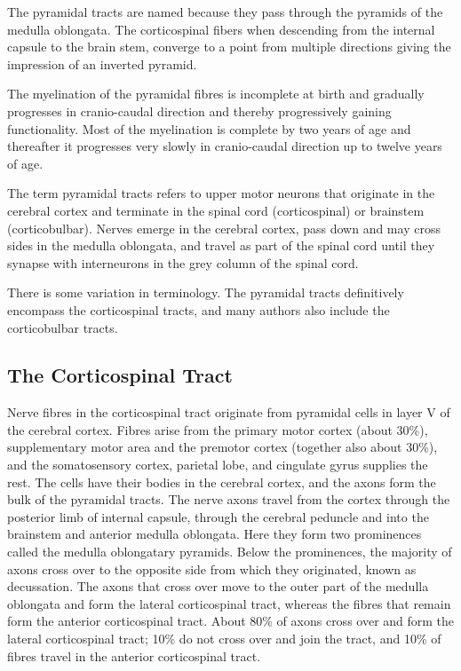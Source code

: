 The pyramidal tracts are named because they pass through the pyramids of the medulla oblongata. The corticospinal fibers when descending from the internal capsule to the brain stem, converge to a point from multiple directions giving the impression of an inverted pyramid.

The myelination of the pyramidal fibres is incomplete at birth and gradually progresses in cranio-caudal direction and thereby progressively gaining functionality. Most of the myelination is complete by two years of age and thereafter it progresses very slowly in cranio-caudal direction up to twelve years of age.

The term pyramidal tracts refers to upper motor neurons that originate in the cerebral cortex and terminate in the spinal cord (corticospinal) or brainstem (corticobulbar). Nerves emerge in the cerebral cortex, pass down and may cross sides in the medulla oblongata, and travel as part of the spinal cord until they synapse with interneurons in the grey column of the spinal cord.

There is some variation in terminology. The pyramidal tracts definitively encompass the corticospinal tracts, and many authors also include the corticobulbar tracts.

\hypertarget{the-corticospinal-tract}{%
\subsection{The Corticospinal Tract}\label{the-corticospinal-tract}}

Nerve fibres in the corticospinal tract originate from pyramidal cells in layer V of the cerebral cortex. Fibres arise from the primary motor cortex (about 30\%), supplementary motor area and the premotor cortex (together also about 30\%), and the somatosensory cortex, parietal lobe, and cingulate gyrus supplies the rest. The cells have their bodies in the cerebral cortex, and the axons form the bulk of the pyramidal tracts. The nerve axons travel from the cortex through the posterior limb of internal capsule, through the cerebral peduncle and into the brainstem and anterior medulla oblongata. Here they form two prominences called the medulla oblongatary pyramids. Below the prominences, the majority of axons cross over to the opposite side from which they originated, known as decussation. The axons that cross over move to the outer part of the medulla oblongata and form the lateral corticospinal tract, whereas the fibres that remain form the anterior corticospinal tract. About 80\% of axons cross over and form the lateral corticospinal tract; 10\% do not cross over and join the tract, and 10\% of fibres travel in the anterior corticospinal tract.

